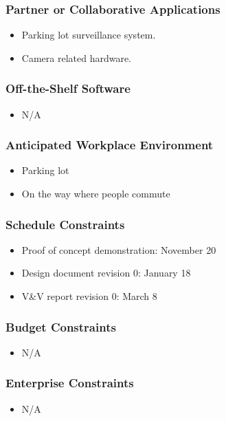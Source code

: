 \documentclass[12pt,letterpaper]{article}
\begin{document}
\subsubsection{Partner or Collaborative Applications}
\begin{itemize}
    \item Parking lot surveillance system.
    \item Camera related hardware.
\end{itemize}
\subsubsection{Off-the-Shelf Software}
\begin{itemize}
    \item N/A
\end{itemize}
\subsubsection{Anticipated Workplace Environment}
\begin{itemize}
    \item Parking lot 
    \item On the way where people commute
\end{itemize}
\subsubsection{Schedule Constraints}
\begin{itemize}
    \item Proof of concept demonstration: November 20
    \item Design document revision 0: January 18
    \item V\&V report revision 0: March 8
\end{itemize}
\subsubsection{Budget Constraints}
\begin{itemize}
    \item N/A
\end{itemize}
\subsubsection{Enterprise Constraints}
\begin{itemize}
    \item N/A
\end{itemize}
\end{document}
